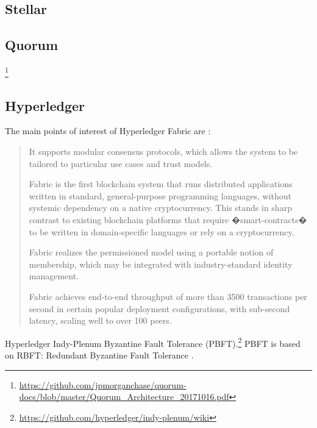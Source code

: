\subsection{Stellar}


\subsection{Quorum}

\footnote{\url{https://github.com/jpmorganchase/quorum-docs/blob/master/Quorum_Architecture_20171016.pdf}}



\subsection{Hyperledger}
The main points of interest of Hyperledger Fabric are \cite{AndroulakiEtAl2018}:

\begin{quote}
\begin{packed_item1}
\item It supports modular consensus protocols, which allows the system to be tailored to particular use cases and trust models.
\item Fabric is the first blockchain system that runs distributed applications written in standard, general-purpose programming languages, without systemic dependency on a native cryptocurrency. This stands in sharp contrast to existing blockchain platforms that require �smart-contracts� to be written in domain-specific languages or rely on a cryptocurrency.
\item Fabric realizes the permissioned model using a portable notion of membership, which may be integrated with industry-standard identity management.
\item Fabric achieves end-to-end throughput of more than 3500 transactions per second in certain popular deployment configurations, with sub-second latency, scaling well to over 100 peers.
\end{packed_item1}
\end{quote}



Hyperledger Indy-Plenum Byzantine Fault Tolerance (PBFT).\footnote{\url{https://github.com/hyperledger/indy-plenum/wiki}} PBFT is based on RBFT: Redundant Byzantine Fault Tolerance
\cite{Aublinetal2013}.



